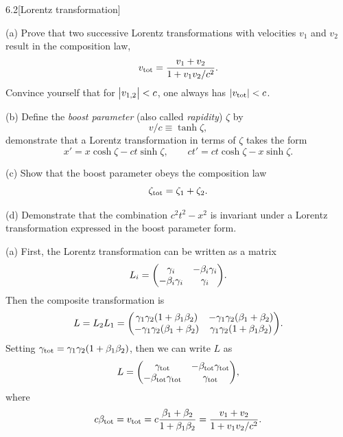 \documentclass[12pt]{article}
\begin{document}
\newpage
\begin{problem}{6.2}[Lorentz transformation]

(a) Prove that two successive Lorentz transformations with velocities $v_1$ and
$v_2$ result in the composition law,
\begin{equation}
    v_{\text{tot}}=\frac{v_1+v_2}{1+v_1v_2/c^2}. 
\end{equation}
Convince yourself that for $\abs{v_{1,2}}<c$, one always has
$\abs{v_{\text{tot}}}<c$.

(b) Define the \textit{boost parameter} (also called \textit{rapidity}) $\zeta$
by
\begin{equation}
    v/c\equiv\tanh\zeta, 
\end{equation}
demonstrate that a Lorentz transformation in terms of $\zeta$ takes the form
\begin{equation}
    x'=x\cosh\zeta-ct\sinh\zeta,\qquad ct'=ct\cosh\zeta-x\sinh\zeta. 
\end{equation}

(c) Show that the boost parameter obeys the composition law
\begin{equation}
    \zeta_{\text{tot}}=\zeta_1+\zeta_2. 
\end{equation}

(d) Demonstrate that the combination $c^2t^2-x^2$ is invariant under a Lorentz
transformation expressed in the boost parameter form.
\begin{solution}
(a) First, the Lorentz transformation can be written as a matrix
\begin{equation}
    L_i=\mqty(\gamma_i&-\beta_i\gamma_i\\-\beta_i\gamma_i&\gamma_i).
\end{equation}
Then the composite transformation is
\begin{equation}
    L=L_2L_1=\mqty(\gamma_1\gamma_2(1+\beta_1\beta_2)&-\gamma_1\gamma_2(\beta_1+\beta_2)\\-\gamma_1\gamma_2(\beta_1+\beta_2)&\gamma_1\gamma_2(1+\beta_1\beta_2)).
\end{equation}
Setting $\gamma_{\text{tot}}=\gamma_1\gamma_2\qty(1+\beta_1\beta_2)$, then we can 
write $L$ as
\begin{equation}
    L=\mqty(\gamma_\t{tot}&-\beta_\t{tot}\gamma_\t{tot}\\-\beta_\t{tot}\gamma_\t{tot}&\gamma_\t{tot}), 
\end{equation}
where
\begin{equation}\label{p2a:b}
    c\beta_{\text{tot}}=v_{\text{tot}}
    =c\frac{\beta_1+\beta_2}{1+\beta_1\beta_2}
    =\frac{v_1+v_2}{1+v_1v_2/c^2}.
\end{equation}


\end{solution}
\end{problem}
\end{document}
